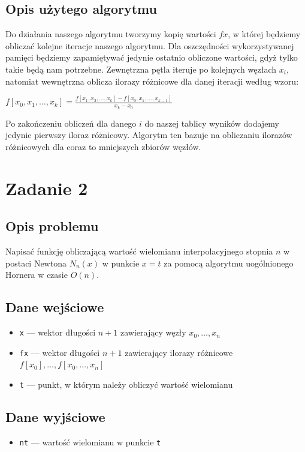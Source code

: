 \documentclass{article}
\begin{document}
\subsection*{Opis użytego algorytmu}
	Do działania naszego algorytmu tworzymy kopię wartości $fx$, w której będziemy obliczać kolejne iteracje naszego algorytmu. Dla oszczędności wykorzystywanej pamięci będziemy zapamiętywać jedynie ostatnio obliczone wartości, gdyż tylko takie będą nam potrzebne. Zewnętrzna pętla iteruje po kolejnych węzłach $x_i$, natomiat wewnętrzna oblicza ilorazy różnicowe dla danej iteracji według wzoru:\\
\centerline{$f[x_0, x_1, \ldots, x_k] = \frac{f[x_1, x_2, \ldots, x_k] - f[x_0, x_1, \ldots, x_{k-1}]}{x_k - x_0}$}
	Po zakończeniu obliczeń dla danego $i$ do naszej tablicy wyników dodajemy jedynie pierwszy iloraz różnicowy. Algorytm ten bazuje na obliczaniu ilorazów różnicowych dla coraz to mniejszych zbiorów węzłów.

\clearpage

\section*{Zadanie 2}
\subsection*{Opis problemu}
	Napisać funkcję obliczającą wartość wielomianu interpolacyjnego stopnia $n$ w postaci Newtona $N_n(x)$ w punkcie $x = t$ za pomocą algorytmu uogólnionego Hornera w czasie $O(n)$.
\subsection*{Dane wejściowe}
	\begin{itemize}
	    \item \texttt{x} — wektor długości $n+1$ zawierający węzły $x_0,\dots,x_n$
	    \item \texttt{fx} — wektor długości $n+1$ zawierający ilorazy różnicowe $f[x_0], \dots, f[x_0,\dots,x_n]$
	    \item \texttt{t} — punkt, w którym należy obliczyć wartość wielomianu
	\end{itemize}
\subsection*{Dane wyjściowe}
	\begin{itemize}
	    \item \texttt{nt} — wartość wielomianu w punkcie \texttt{t}
	\end{itemize}
\end{document}

